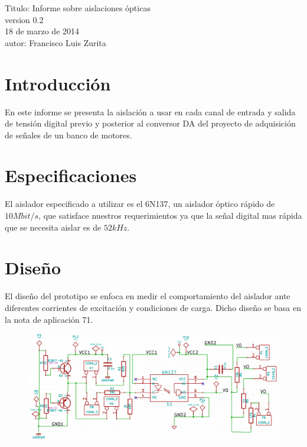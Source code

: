 \documentclass[12pt,a4paper]{article}
\begin{document}
\setlength{\parindent}{0cm}

Titulo: Informe sobre aislaciones ópticas\\
version 0.2\\
18 de marzo de 2014\\
autor: Francisco Luis Zurita\\

\section{\textbf{Introducción}}

En este informe se presenta la aislación a usar en cada canal de entrada y salida de tensión digital previo y posterior al conversor DA del proyecto de adquisición de señales de un banco de motores.

\section{\textbf{Especificaciones}}

El aislador especificado a utilizar es el 6N137, un aislador óptico rápido de $10Mbit/s$, que satisface nuestros requerimientos ya que la señal digital mas rápida que se necesita aislar es de $52kHz$.

\section{\textbf{Diseño}}

El diseño del prototipo se enfoca en medir el comportamiento del aislador ante diferentes corrientes de excitación y condiciones de carga.
Dicho diseño se basa en la nota de aplicación 71\cite{AN}.\\

\begin{figure}[H]
\centering
\includegraphics[scale=0.5]{img/optoaislacion.png}
\end{figure}
\end{document}
